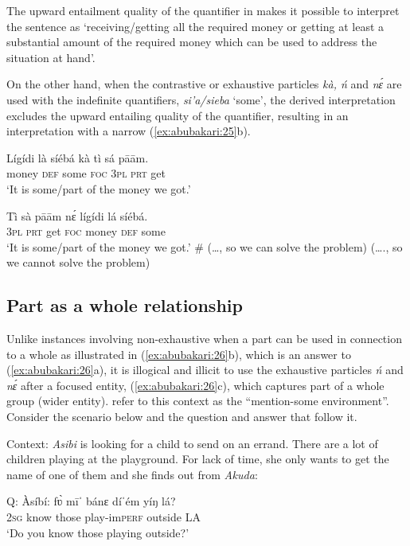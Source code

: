 \documentclass[output=paper
,newtxmath
,modfonts
,nonflat]{langsci/langscibook}
\begin{document}
The upward entailment quality of the quantifier in  makes it possible to interpret the sentence as ‘receiving/getting all the required money or getting at least a substantial amount of the required money which can be used to address the situation at hand’.

On the other hand, when the contrastive or exhaustive  particles \textit{kà, ń} and \textit{nɛ́} are used with the indefinite quantifiers, \textit{si’a/sieba} ‘some’, the derived interpretation excludes the upward entailing quality of the quantifier, resulting in an interpretation with a narrow  (\ref{ex:abubakari:25}b).

 
\ea\label{ex:abubakari:25}
\ea\label{ex:abubakari:25a} 
\gll Lígídi  là  síébá  kà  tì  sá  pāām.\\
 money  \textsc{def}  some  \textsc{foc}  3\textsc{pl}  \textsc{prt}  get\\
\glt ‘It is some/part of the money we got.’
 

\ex\label{ex:abubakari:25b} 
\gll Tì  sà  pāām  nɛ́  lígídi    lá  síébá.\\
3\textsc{pl}  \textsc{prt}  get  \textsc{foc}  money  \textsc{def}  some\\
\glt ‘It is some/part of the money we got.’
\glt \# (…, so we can solve the problem)
\glt (…., so we cannot solve the problem)
\z
\z

\subsection{Part as a whole relationship} 

Unlike instances involving non-exhaustive  when a part can be used in connection to a whole as illustrated in (\ref{ex:abubakari:26}b), which is an answer to (\ref{ex:abubakari:26}a), it is illogical and illicit to use the exhaustive particles \textit{ń} and \textit{nɛ́} after a focused entity, (\ref{ex:abubakari:26}c), which captures part of a whole group (wider entity). \citet[253]{hartmann2007} refer to this context as the “mention-some environment”. Consider the scenario below and the question and answer that follow it.

 
\ea\label{ex:abubakari:26} 
Context: \textit{Asibi} is looking for a child to send on an errand. There are a lot of children playing at the playground. For lack of time, she only wants to get the name of one of them and she finds out from \textit{Akuda}:
 
\ea\label{ex:abubakari:26a}
Q: Àsíbí: \gll fʋ̀  mīˈ  bánɛ  díˈém    yíŋ lá?\\
2\textsc{sg}  know  those  play-im\textsc{perf}  outside LA\\
\glt ‘Do you know those playing outside?’
\end{document}
